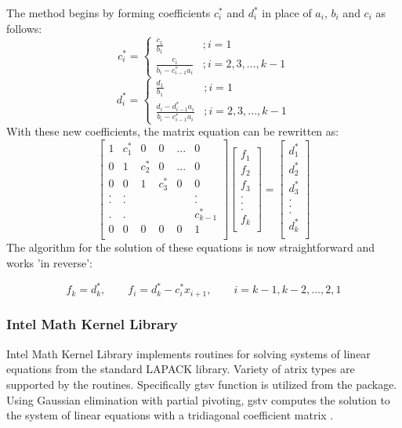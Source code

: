 \documentclass[12pt, oneside]{book}
\theoremstyle{plain}
\theoremstyle{definition}
\begin{document}
The method begins by forming coefficients \(c^{*}_i\) and \(d^{*}_i\) in place of \(a_i\), \(b_i\) and \(c_i\) as follows:
$$
c^{*}_i = \left\{
     \begin{array}{lr}
       \frac{c_1}{b_1} & ; i = 1\\
       \frac{c_i}{b_i - c^{*}_{i-1} a_i} & ; i = 2,3,...,k-1
     \end{array}
   \right.
$$
$$   
d^{*}_i = \left\{
     \begin{array}{lr}
       \frac{d_1}{b_1} & ; i = 1\\
       \frac{d_i-d^{*}_{i-1} a_i}{b_i - c^{*}_{i-1} a_i} & ; i = 2,3,...,k-1
     \end{array}
   \right.
   $$
With these new coefficients, the matrix equation can be rewritten as:
$$
\begin{bmatrix}  
1 & c^{*}_1 & 0 & 0 & ... & 0 \\ 
0 & 1 & c^{*}_2 & 0 & ... & 0 \\ 
0 & 0 & 1 & c^{*}_3 & 0 & 0 \\ 
. & . &  &  &  & . \\ 
. & . &  &  &  & . \\ 
. & . &  &  &  & c^{*}_{k-1} \\ 
0 & 0 & 0 & 0 & 0 & 1 \\ 
\end{bmatrix} \begin{bmatrix}  
f_1 \\ 
f_2 \\ 
f_3 \\ 
.\\ 
.\\ 
.\\ 
f_k \\ 
\end{bmatrix} = \begin{bmatrix} 
d^{*}_1 \\ 
d^{*}_2 \\ 
d^{*}_3 \\ 
.\\ 
.\\ 
.\\ 
d^{*}_k \\ 
\end{bmatrix}
$$
The algorithm for the solution of these equations is now straightforward and works 'in reverse':

\[ f_k = d^{*}_k, \qquad f_i = d^{*}_k - c^{*}_i x_{i+1}, \qquad i = k-1, k-2, ... ,2,1 \]


 \subsubsection{Intel Math Kernel Library}
Intel Math Kernel Library implements routines for solving systems of linear equations from the standard LAPACK library. Variety of atrix types are supported by the routines.  Specifically gtsv function is utilized from the package. Using Gaussian elimination with partial pivoting, gstv computes the solution to the system of linear equations with a tridiagonal coefficient matrix \cite{gtsv}.  
 
\end{document}
